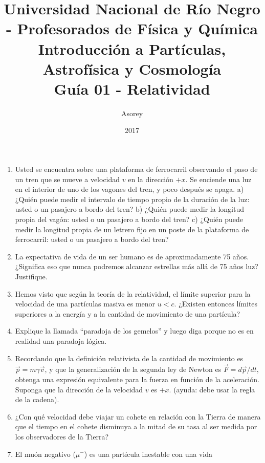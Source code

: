 \documentclass[a4paper,12pt]{article}
\begin{document}
\title{
{\normalsize{Universidad Nacional de Río Negro - Profesorados de Física y Química}}\\
Introducción a Partículas, Astrofísica y Cosmología \\ Guía 01 - Relatividad\\}
\author{Asorey}
\date{2017}
\maketitle

\begin{enumerate}
	\setcounter{enumi}{0}      %
	\item Usted se encuentra sobre una plataforma de ferrocarril observando el
		paso de un tren que se mueve a velocidad $v$ en la dirección $+x$. Se
		enciende una luz en el interior de uno de los vagones del tren, y poco
		después se apaga. a) ¿Quién puede medir el intervalo de tiempo propio
		de la duración de la luz: usted o un pasajero a bordo del tren? b)
		¿Quién puede medir la longitud propia del vagón: usted o un pasajero a
		bordo del tren? c) ¿Quién puede medir la longitud propia de un letrero
		fijo en un poste de la plataforma de ferrocarril: usted o un pasajero a
		bordo del tren?
	\item La expectativa de vida de un ser humano es de aproximadamente 75
		años. ¿Significa eso que nunca podremos alcanzar estrellas más allá de
		75 años luz? Justifique. 
	\item Hemos visto que según la teoría de la relatividad, el límite superior
		para la velocidad de una partículas masiva es menor $u < c$. ¿Existen
		entonces límites superiores a la energía y a la cantidad de movimiento
		de una partícula?
	\item Explique la llamada ``paradoja de los gemelos'' y luego diga porque
		no es en realidad una paradoja lógica.
	\item Recordando que la definición relativista de la cantidad de movimiento
		es $\vec{p}=m \gamma \vec{v}$, y que la generalización de la segunda
		ley de Newton es $\vec{F}=d\vec{p}/dt$, obtenga una expresión
		equivalente para la fuerza en función de la aceleración. Suponga que la
		dirección de la velocidad $v$ es $+x$. (ayuda: debe usar la regla de la
		cadena).   
	\item ¿Con qué velocidad debe viajar un cohete en relación con la Tierra de
		manera que el tiempo en el cohete disminuya a la mitad de su tasa al
		ser medida por los observadores de la Tierra?
	\item El muón negativo ($\mu^-$) es una partícula inestable con una vida

\end{enumerate}
\end{document}
